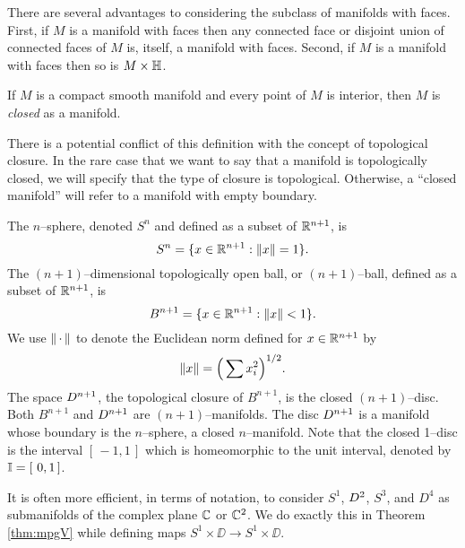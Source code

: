 There are several advantages to considering the subclass of manifolds with faces.
First, if $M$ is a manifold with faces then any connected face or disjoint union of connected faces of $M$ is, itself, a manifold with faces.
Second, if $M$ is a manifold with faces then so is $M\times \mathbb{H}$.

%	
%
	
\begin{defn}
	If $M$ is a compact smooth manifold and every point of $M$ is interior, then $M$ is \emph{closed} as a manifold.
\end{defn}

There is a potential conflict of this definition with the concept of topological closure.
In the rare case that we want to say that a manifold is topologically closed, we will specify that the type of closure is topological.
Otherwise, a ``closed manifold'' will refer to a manifold with empty boundary.

\begin{ex}
	The $n$--sphere, denoted $S^n$ and defined as a subset of $\mathbb{R}^{n+1}$, is
	\[
	S^n = \{x\in\mathbb{R}^{n+1}:\left\lVert x \right\rVert=1\}.
	\]
	The $(n+1)$--dimensional topologically open ball, or $(n+1)$--ball, defined as a subset of $\mathbb{R}^{n+1}$, is
	\[
	B^{n+1} = \{x\in\mathbb{R}^{n+1}:\left\lVert x \right\rVert< 1\}.
	\]
	We use $\left\lVert \,\cdot\, \right\rVert$ to denote the Euclidean norm defined for $x\in\mathbb{R}^{n+1}$ by
	\[
	\left\lVert x \right\rVert = \Big( \sum x_i^2 \Big)^{1/2}.
	\]
	The space $D^{n+1}$, the topological closure of $B^{n+1}$, is the closed $(n+1)$--disc.
	Both $B^{n+1}$ and $D^{n+1}$ are $(n+1)$--manifolds.
	The disc $D^{n+1}$ is a manifold whose boundary is the $n$--sphere, a closed $n$--manifold.
	Note that the closed 1--disc is the interval $[\,-1,1\,]$ which is homeomorphic to the unit interval, denoted by $\mathbb{I}=[\ 0,1\,]$.
	
	It is often more efficient, in terms of notation, to consider $S^1$, $D^2$, $S^3$, and $D^4$ as submanifolds of the complex plane $\mathbb{C}$ or $\mathbb{C}^2$.
	We do exactly this in Theorem \ref{thm:mpgV} while defining maps $S^1\times\DD\to S^1\times\DD$.
\end{ex}

